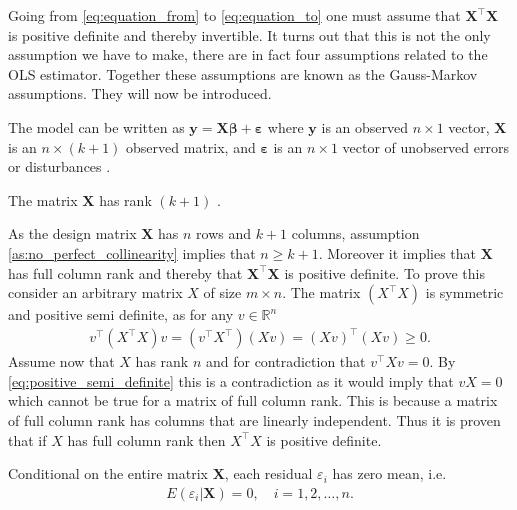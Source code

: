 Going from \eqref{eq:equation_from} to \eqref{eq:equation_to} one must assume that $\mathbf{X}^\top\mathbf{X}$ is positive definite and thereby invertible.
It turns out that this is not the only assumption we have to make, there are in fact four assumptions related to the OLS estimator.
Together these assumptions are known as the Gauss-Markov assumptions. 
They will now be introduced.
\begin{assumption}\label{as:linear_in_the_parameters}
    The model can be written as $\mathbf{y} = \mathbf{X}\boldsymbol{\beta} + \boldsymbol{\varepsilon}$ where $\mathbf{y}$ is an observed $n \times 1$ vector, $\mathbf{X}$ is an $n \times (k + 1)$ observed matrix, and $\boldsymbol{\varepsilon}$ is an $n \times 1$ vector of unobserved errors or disturbances \cite[p. 809]{Wooldridge2012}.
\end{assumption}
\begin{assumption}\label{as:no_perfect_collinearity}
    The matrix $\mathbf{X}$ has rank $(k + 1)$ \cite[p. 810]{Wooldridge2012}.
\end{assumption}
As the design matrix $\mathbf{X}$ has $n$ rows and $k + 1$ columns, assumption \ref{as:no_perfect_collinearity} implies that $n \geq k + 1$.
Moreover it implies that $\mathbf{X}$ has full column rank and thereby that $\mathbf{X}^\top\mathbf{X}$ is positive definite.
To prove this consider an arbitrary matrix $X$ of size $m \times n$.
The matrix $(X^\top X)$ is symmetric and positive semi definite, as for any $v \in \mathbb{R}^n$
\begin{align}\label{eq:positive_semi_definite}
v^\top (X^\top X) v = (v^\top X^\top) (X v) = (X v)^\top (X v) \geq 0.
\end{align}
Assume now that $X$ has rank $n$ and for contradiction that $v^\top X v = 0$.
By \eqref{eq:positive_semi_definite} this is a contradiction as it would imply that $vX = 0$ which cannot be true for a matrix of full column rank.
This is because a matrix of full column rank has columns that are linearly independent.
Thus it is proven that if $X$ has full column rank then $X^\top X$ is positive definite.
\begin{assumption}\label{as:zero_conditional_mean}
    Conditional on the entire matrix $\mathbf{X}$, each residual $\varepsilon_i$ has zero mean, i.e. \cite[p. 810]{Wooldridge2012}
    \begin{align*}
        E(\varepsilon_i | \mathbf{X}) = 0, \quad i = 1, 2, \ldots, n.
    \end{align*}
\end{assumption}
